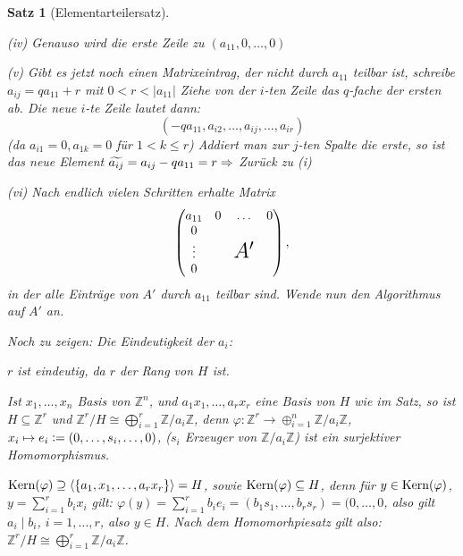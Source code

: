 \documentclass[a4paper,10pt,german]{scrbook}
\theoremstyle{saetze}
\newtheorem{Satz}{Satz}
\theoremstyle{definitionen}
\begin{document}
\begin{Satz}[Elementarteilersatz]
{\begin{enum}
            \item[(iv)] Genauso wird die erste Zeile zu $(a_{11}, 0, \dots, 0)$
            
            \item[(v)] Gibt es jetzt noch einen Matrixeintrag, der nicht durch 
            $a_{11}$ teilbar ist, schreibe $a_{ij} = q a_{11} + r$ mit $0 < r <
            |a_{11}|$ Ziehe von der $i$-ten Zeile das $q$-fache der ersten ab. 
            Die neue $i$-te Zeile lautet dann: \[(-q a_{11}, a_{i2}, \dots, 
            a_{ij}, \dots, a_{ir})\] (da $a_{i1} = 0, a_{1k} = 0$ für $1<k\leq
            r$) \newline
            Addiert man zur $j$-ten Spalte die erste, so ist das neue Element
            $\widetilde{a_{ij}} = a_{ij} - q a_{11} = r \Rightarrow$ Zurück zu (i)
            
            \item[(vi)] Nach endlich vielen Schritten erhalte Matrix 
            \[\begin{pmatrix} a_{11} & 0 & \hdots & 0 \\ 0 \\ \vdots &  & 
            \mbox{\LARGE $A'$}\\ 0 \end{pmatrix},\] in der alle Einträge von
            $A'$ durch $a_{11}$ teilbar sind. Wende nun den Algorithmus auf $A'$ an.
        \end{enum}


        Noch zu zeigen: Die Eindeutigkeit der $a_i$:

	$r$ ist eindeutig, da $r$ der Rang von $H$ ist.

	Ist $x_1,\ldots,x_n$ Basis von $\mathbb Z^n$, und $a_1x_1,\ldots,a_rx_r$ eine Basis
	von $H$ wie im Satz, so ist $H \subseteq \mathbb Z^r$ und $\mathbb Z^r/H \cong
	\bigoplus_{i=1}^r \mathbb Z/ a_i\mathbb Z$, denn $\varphi : \mathbb Z^r\to \oplus_{i=1}^n \mathbb Z/a_i\mathbb Z$, $x_i\mapsto e_i\mathrel{\mathop:}= (0,\ldots,s_i,\ldots,0)$, ($s_i$ Erzeuger von $\mathbb Z/a_i\mathbb Z$) ist ein surjektiver Homomorphismus. 

	$\mathop{\rm Kern}\nolimits(\varphi) \supseteq \langle\{a_1,x_1,\ldots,a_rx_r\}\rangle = H$, sowie $\mathop{\rm Kern}\nolimits(\varphi) \subseteq H$, denn für $y\in \mathop{\rm Kern}\nolimits(\varphi)$, $y=\sum_{i=1}^r b_ix_i$ gilt: $\varphi(y) = \sum_{i=1}^r b_i e_i = (b_1s_1,\ldots,b_rs_r) = (0,\ldots,0$, also gilt $a_i\mid b_i$, $i=1,\ldots,r$, also $y\in H$. Nach dem Homomorhpiesatz gilt also: $\mathbb Z^r/H \cong
	\bigoplus_{i=1}^r \mathbb Z/ a_i\mathbb Z$.

}
\end{Satz}
\end{document}
